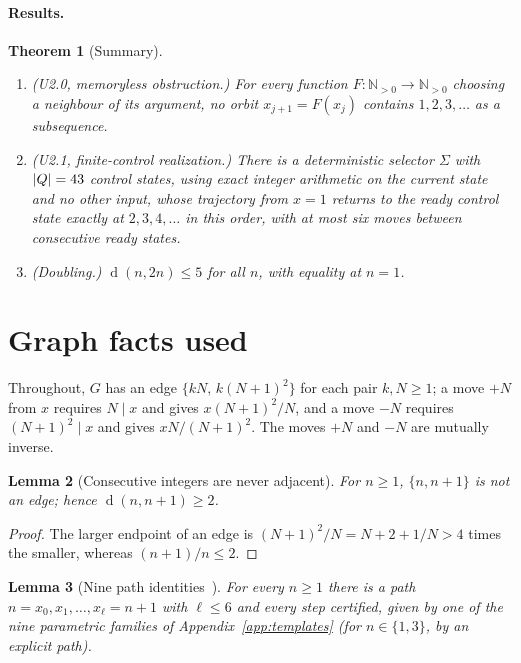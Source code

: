 \documentclass[11pt]{article}
\newtheorem{theorem}{Theorem}[section]
\newtheorem{lemma}[theorem]{Lemma}
\theoremstyle{definition}
\newcommand{\N}{\mathbb{N}}
\newcommand{\dist}{\operatorname{d}}
\begin{document}
\paragraph{Results.}
\begin{theorem}[Summary]\label{thm:summary}
\begin{enumerate}[label=(\alph*),nosep]
\item \emph{(U2.0, memoryless obstruction.)} For every function $F:\N_{>0}\to\N_{>0}$ choosing a neighbour of its argument, no orbit
$x_{j+1}=F(x_j)$ contains $1,2,3,\dots$ as a subsequence.
\item \emph{(U2.1, finite-control realization.)} There is a deterministic selector $\Sigma$ with $|Q|=43$ control states, using
exact integer arithmetic on the current state and no other input, whose trajectory from $x=1$ returns to the ready
control state exactly at $2,3,4,\dots$ in this order, with at most six moves between consecutive ready states.
\item \emph{(Doubling.)} $\dist(n,2n)\le5$ for all $n$, with equality at $n=1$.
\end{enumerate}
\end{theorem}

\section{Graph facts used}\label{sec:facts}
Throughout, $G$ has an edge $\{kN,\,k(N+1)^2\}$ for each pair $k,N\ge1$; a move $+N$ from $x$ requires $N\mid x$ and gives
$x(N+1)^2/N$, and a move $-N$ requires $(N+1)^2\mid x$ and gives $xN/(N+1)^2$. The moves $+N$ and $-N$ are mutually inverse.

\begin{lemma}[Consecutive integers are never adjacent]\label{lem:nonadj}
For $n\ge1$, $\{n,n+1\}$ is not an edge; hence $\dist(n,n+1)\ge2$.
\end{lemma}
\begin{proof} The larger endpoint of an edge is $(N+1)^2/N=N+2+1/N>4$ times the smaller, whereas $(n+1)/n\le2$. \end{proof}

\begin{lemma}[Nine path identities~\cite{u1bnd}]\label{lem:identities}
For every $n\ge1$ there is a path $n=x_0,x_1,\dots,x_\ell=n+1$ with $\ell\le6$ and every step certified, given by one of the nine
parametric families of Appendix~\ref{app:templates} (for $n\in\{1,3\}$, by an explicit path).
\end{lemma}
\end{document}
